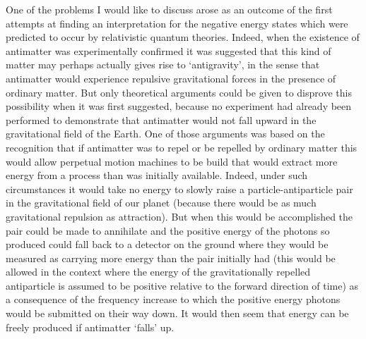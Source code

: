 \documentclass[notitlepage,12pt]{report}
\begin{document}
One of the problems I would like to discuss arose as an outcome of the first attempts at finding an interpretation for the negative energy states which were predicted to occur by relativistic quantum theories. Indeed, when the existence of antimatter was experimentally confirmed it was suggested that this kind of matter may perhaps actually gives rise to `antigravity', in the sense that antimatter would experience repulsive gravitational forces in the presence of ordinary matter. But only theoretical arguments could be given to disprove this possibility when it was first suggested, because no experiment had already been performed to demonstrate that antimatter would not fall upward in the gravitational field of the Earth. One of those arguments was based on the recognition that if antimatter was to repel or be repelled by ordinary matter this would allow perpetual motion machines to be build that would extract more energy from a process than was initially available. Indeed, under such circumstances it would take no energy to slowly raise a particle-antiparticle pair in the gravitational field of our planet (because there would be as much gravitational repulsion as attraction). But when this would be accomplished the pair could be made to annihilate and the positive energy of the photons so produced could fall back to a detector on the ground where they would be measured as carrying more energy than the pair initially had (this would be allowed in the context where the energy of the gravitationally repelled antiparticle is assumed to be positive relative to the forward direction of time) as a consequence of the frequency increase to which the positive energy photons would be submitted on their way down. It would then seem that energy can be freely produced if antimatter `falls' up.
\end{document}
